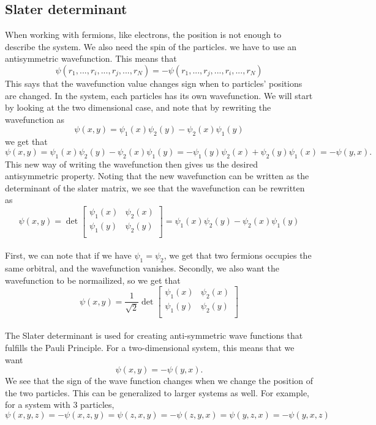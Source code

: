 \subsection{Slater determinant}
When working with fermions, like electrons, the position is not enough to describe the system. We also need the spin of the particles. we have to use an antisymmetric wavefunction. This means that 
\begin{equation}
    \psi(r_1,...,r_i,...,r_j, ..., r_N) = -\psi(r_1, ..., r_j, ..., r_i, ..., r_N)
\end{equation}
This says that the wavefunction value changes sign when to particles' positions are changed. 
In the system, each particles has its own wavefunction. We will start by looking at the two dimensional case, and note that by rewriting the wavefunction as
\begin{equation}
    \psi(x,y) = \psi_1(x)\psi_2(y) - \psi_2(x)\psi_1(y)
\end{equation}
we get that 
\begin{equation}
    \psi(x,y) = \psi_1(x)\psi_2(y) - \psi_2(x)\psi_1(y) = -\psi_1(y)\psi_2(x) + \psi_2(y)\psi_1(x) = -\psi(y,x).
\end{equation}
This new way of writing the wavefunction then gives us the desired antisymmetric property. Noting that the new wavefunction can be written as the determinant of the slater matrix, we see that the wavefunction can be rewritten as
\begin{equation}
    \psi(x,y) = 
    \det\begin{bmatrix}
    \psi_1(x) & \psi_2(x) \\
    \psi_1(y) & \psi_2(y) \\
    \end{bmatrix}
    = \psi_1(x)\psi_2(y) - \psi_2(x)\psi_1(y)
\end{equation}
\\
First, we can note that if we have $\psi_1 = \psi_2$, we get that two fermions occupies the same orbitral, and the wavefunction vanishes. Secondly, we also want the wavefunction to be normailized, so we get that
\begin{equation}
    \psi(x,y) = \frac{1}{\sqrt{2}}
    \det\begin{bmatrix}
    \psi_1(x) & \psi_2(x) \\
    \psi_1(y) & \psi_2(y) \\
    \end{bmatrix}
\end{equation}
\\
The Slater determinant is used for creating anti-symmetric wave functions that fulfills the Pauli Principle. For a two-dimensional system, this means that we want 
\begin{equation}
    \psi(x,y) = -\psi(y,x).
\end{equation}
We see that the sign of the wave function changes when we change the position of the two particles. This can be generalized to larger systems as well. For example, for a system with 3 particles, 
\begin{equation}
    \psi(x,y,z) = -\psi(x,z,y) = \psi(z,x,y) = -\psi(z,y,x) = \psi(y,z,x) = -\psi(y,x,z) 
\end{equation}
